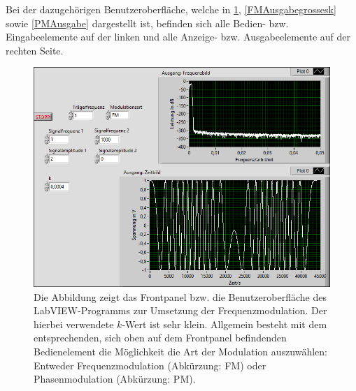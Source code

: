 \documentclass[
a4paper,
12pt,
pagesize,
ngerman
]{scrartcl}
\begin{document}
	
	\noindent Bei der dazugehörigen Benutzeroberfläche, welche in \cref{FMAusgabekleinesk}, \cref{FMAusgabegrossesk} sowie \cref{PMAusgabe} dargestellt ist, befinden sich alle Bedien- bzw. Eingabeelemente auf der linken und alle Anzeige- bzw. Ausgabeelemente auf der rechten Seite.
	
	\begin{figure}[H]
		\centering
		\includegraphics[width=1.0\textwidth]{EIRE2018Dateien/Tag4/FMPM-Erzeugung/FM-FMPM-Erzeugungp}
		\caption{Die Abbildung zeigt das Frontpanel bzw. die Benutzeroberfläche des LabVIEW-Programms zur Umsetzung der Frequenzmodulation. Der hierbei verwendete $k$-Wert ist sehr klein. Allgemein besteht mit dem entsprechenden, sich oben auf dem Frontpanel befindenden Bedienelement die Möglichkeit die Art der Modulation auszuwählen: Entweder Frequenzmodulation (Abkürzung: FM) oder Phasenmodulation (Abkürzung: PM).}
		\label{FMAusgabekleinesk}
	\end{figure}
	
\end{document}
